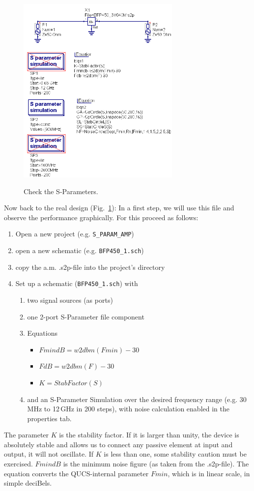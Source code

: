 \begin{figure}
  \centering
  {\includegraphics[width=8cm]{bfp450_1_sch.png}}
  \caption{Check the S-Parameters.}
  \label{fig:bfp450_1_sch}
\end{figure}


Now back to the real design (Fig.~\ref{fig:bfp450_1_sch}): In a first step,
we will use this file and observe the performance graphically. For
this proceed as follows:
\begin{enumerate}
\item Open a new project (e.g. {\tt S\_PARAM\_AMP})
\item open a new schematic (e.g. {\tt BFP450\_1.sch})
\item copy the a.m. .s2p-file into the project's directory
\item Set up a schematic ({\tt BFP450\_1.sch}) with 
  \begin{enumerate}
  \item two signal sources (as ports)
  \item one 2-port S-Parameter file component
  \item Equations
    \begin{itemize}
    \item $FmindB=w2dbm(Fmin)-30$
    \item $FdB=w2dbm(F)-30$
    \item $K=StabFactor(S)$
    \end{itemize}
  \item and an S-Parameter Simulation over the desired frequency range
    (e.g. 30\,MHz to 12\,GHz in 200 steps), with noise calculation
    enabled in the properties tab.
  \end{enumerate}
\end{enumerate}
The parameter $K$ is the stability factor. If it is larger than unity,
the device is absolutely stable and allows us to connect any passive
element at input and output, it will not oscillate. If $K$ is less
than one, some stability caution must be exercised. $FmindB$ is the
minimum noise figure (as taken from the .s2p-file). The equation
converts the QUCS-internal parameter $Fmin$, which is in linear scale,
in simple deciBels.

